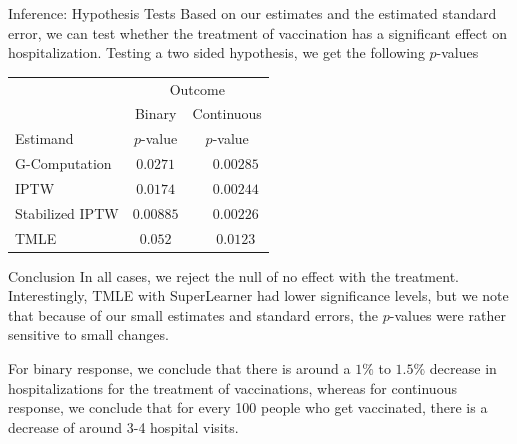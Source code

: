 \documentclass[english]{beamer}
\begin{document}
\begin{frame}{Inference: Hypothesis Tests}
Based on our estimates and the estimated standard error, we can test whether the treatment of vaccination has a significant effect on hospitalization. Testing a two sided hypothesis, we get the following $p$-values
\begin{center}
\begin{tabular}{lcc}
\toprule
 & \multicolumn{2}{c}{Outcome} \\ \cmidrule(lr){2-3}
 & \multicolumn{1}{c}{Binary} & \multicolumn{1}{c}{Continuous} \\ \cmidrule(lr){2-2}\cmidrule(lr){3-3}
Estimand  & $p$-value & $p$-value \\ 
\midrule
G-Computation  & $0.0271$ & $\phantom{-}0.00285$ \\
IPTW  & $0.0174$ & $\phantom{-}0.00244$ \\
Stabilized IPTW  & $0.00885$ & $\phantom{-}0.00226$ \\
TMLE & $0.052$ & $\phantom{-}0.0123$ \\
\bottomrule 
\end{tabular}
\end{center}

\end{frame}

\begin{frame}{Conclusion}
In all cases, we reject the null of no effect with the treatment. Interestingly, TMLE with SuperLearner had lower significance levels, but we note that because of our small estimates and standard errors, the $p$-values were rather sensitive to small changes.

For binary response, we conclude that there is around a $1\%$ to $1.5\%$ decrease in hospitalizations for the treatment of vaccinations, whereas for continuous response, we conclude that for every 100 people who get vaccinated, there is a decrease of around 3-4 hospital visits.
\end{frame}


%
%
\end{document}
